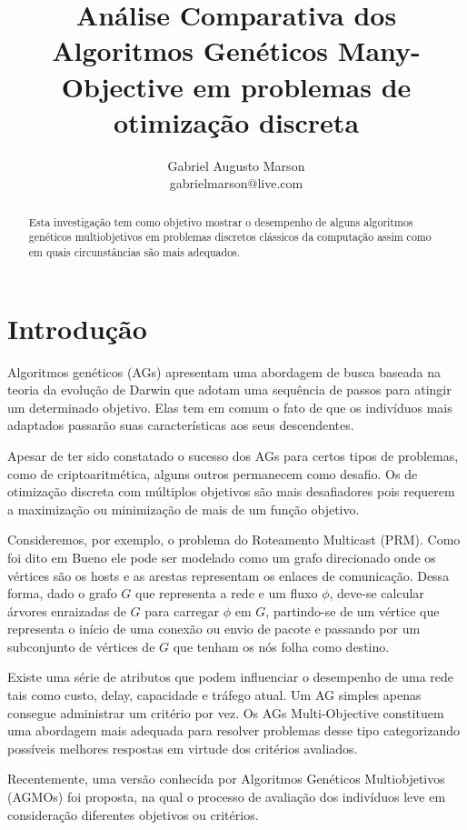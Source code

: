 \documentclass[]{article}
\title{Análise Comparativa dos Algoritmos Genéticos Many-Objective em problemas de otimização discreta}
\author{Gabriel Augusto Marson\\ gabrielmarson@live.com }
\begin{document}
\maketitle

\begin{abstract}
	
	\noindent Esta investigação tem como objetivo mostrar o desempenho de alguns algoritmos genéticos multiobjetivos em problemas discretos clássicos da computação assim como em quais circunstâncias são mais adequados.
	
\end{abstract}

\section{Introdução}	

	Algoritmos genéticos (AGs) apresentam uma abordagem de busca baseada na teoria da evolução de Darwin que adotam uma sequência de passos para atingir um determinado objetivo. Elas tem em comum o fato de que os indivíduos mais adaptados passarão suas características aos seus descendentes.
	
	Apesar de ter sido constatado o sucesso dos AGs para certos tipos de problemas, como de criptoaritmética, alguns outros permanecem como desafio. Os de otimização discreta com múltiplos objetivos são mais desafiadores pois requerem a maximização ou minimização de mais de um função objetivo.
		
	Consideremos, por exemplo, o problema do Roteamento Multicast (PRM). Como foi dito em Bueno \cite{bueno2010heuristicas} ele pode ser modelado como um grafo direcionado onde os vértices são os hosts e as arestas representam os enlaces de comunicação. Dessa forma, dado o grafo $G$ que representa a rede e um fluxo $\phi$, deve-se calcular árvores enraizadas de $G$ para carregar $\phi$ em $G$, partindo-se de um vértice que representa o início de uma conexão ou envio de pacote e passando por um subconjunto de vértices de $G$ que tenham os nós folha como destino.
	
	Existe uma série de atributos que podem influenciar o desempenho de uma rede tais como custo, delay, capacidade e tráfego atual. Um AG simples apenas consegue administrar um critério por vez. Os AGs Multi-Objective constituem uma abordagem mais adequada para resolver problemas desse tipo categorizando possíveis melhores respostas em virtude dos critérios avaliados.
	
	Recentemente, uma versão conhecida por Algoritmos Genéticos Multiobjetivos (AGMOs) foi proposta, na qual o processo de avaliação dos indivíduos leve em consideração diferentes objetivos ou critérios.
	
\end{document}
